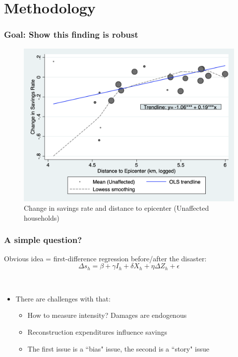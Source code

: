 \documentclass[aspectratio=169]{beamer}
\begin{document}
\section{Methodology}
\begin{frame}
    \frametitle{\Large{Goal: Show this finding is robust}}
	\begin{figure}
	    \caption{\small{Change in savings rate and distance to epicenter (Unaffected households)}}
	    \includegraphics[scale=0.35]{pics/incomecons_plot_RAR2draft} 
	\end{figure}
\end{frame}
\begin{frame}[label=simpleQuestion]
    \frametitle{\LARGE{A simple question?}}
    Obvious idea = first-difference regression before/after the disaster:
    \begin{equation}
        \Delta s_h = \beta + \gamma I_h + \delta X_h + \eta \Delta Z_h + \epsilon
    \end{equation}
	 \\
    \begin{itemize}
        \item<2-> There are challenges with that: \\
        \begin{itemize}
            \item How to measure intensity? Damages are endogenous \hyperlink{threeLittlePigs}{}
            \item Reconstruction expenditures influence savings
            \item<3-> The first issue is a ``bias" issue, the second is a ``story" issue
        \end{itemize}
    \end{itemize}
\end{frame}
\end{document}
